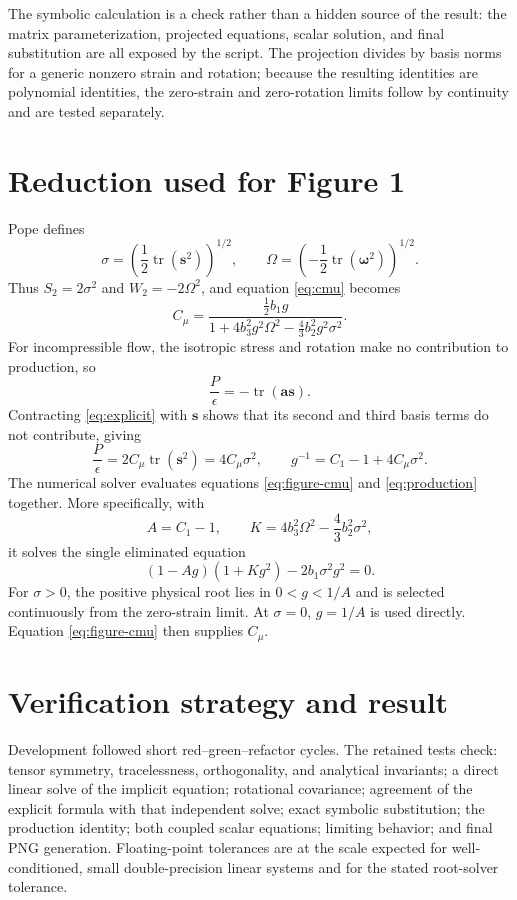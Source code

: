 \documentclass[11pt]{article}
\newcommand{\tr}[1]{\operatorname{tr}\!\left(#1\right)}
\newcommand{\bS}{\bm{s}}
\newcommand{\bW}{\bm{\omega}}
\newcommand{\bA}{\bm{a}}
\begin{document}
The symbolic calculation is a check rather than a hidden source of the result:
the matrix parameterization, projected equations, scalar solution, and final
substitution are all exposed by the script.  The projection divides by basis
norms for a generic nonzero strain and rotation; because the resulting
identities are polynomial identities, the zero-strain and zero-rotation limits
follow by continuity and are tested separately.

\section{Reduction used for Figure 1}
Pope defines
\begin{equation}
 \sigma=\left(\frac12\tr{\bS^2}\right)^{1/2},\qquad
 \Omega=\left(-\frac12\tr{\bW^2}\right)^{1/2}.
\end{equation}
Thus $S_2=2\sigma^2$ and $W_2=-2\Omega^2$, and equation
\eqref{eq:cmu} becomes
\begin{equation}
 C_\mu=\frac{\tfrac12b_1g}
 {1+4b_3^2g^2\Omega^2-\tfrac43b_2^2g^2\sigma^2}.
 \label{eq:figure-cmu}
\end{equation}
For incompressible flow, the isotropic stress and rotation make no contribution
to production, so
\begin{equation}
 \frac{P}{\epsilon}=-\tr{\bA\bS}.
\end{equation}
Contracting \eqref{eq:explicit} with $\bS$ shows that its second and third
basis terms do not contribute, giving
\begin{equation}
 \frac{P}{\epsilon}=2C_\mu\tr{\bS^2}=4C_\mu\sigma^2,
 \qquad
 g^{-1}=C_1-1+4C_\mu\sigma^2.
 \label{eq:production}
\end{equation}
The numerical solver evaluates equations \eqref{eq:figure-cmu} and
\eqref{eq:production} together.  More specifically, with
\begin{equation}
 A=C_1-1,\qquad
 K=4b_3^2\Omega^2-\frac43b_2^2\sigma^2,
\end{equation}
it solves the single eliminated equation
\begin{equation}
 (1-Ag)(1+Kg^2)-2b_1\sigma^2g^2=0.
 \label{eq:root}
\end{equation}
For $\sigma>0$, the positive physical root lies in $0<g<1/A$ and is selected
continuously from the zero-strain limit.  At $\sigma=0$, $g=1/A$ is used
directly.  Equation \eqref{eq:figure-cmu} then supplies $C_\mu$.

\section{Verification strategy and result}
Development followed short red--green--refactor cycles.  The retained tests
check: tensor symmetry, tracelessness, orthogonality, and analytical invariants;
a direct linear solve of the implicit equation; rotational covariance; agreement
of the explicit formula with that independent solve; exact symbolic
substitution; the production identity; both coupled scalar equations; limiting
behavior; and final PNG generation.  Floating-point tolerances are at the scale
expected for well-conditioned, small double-precision linear systems and for
the stated root-solver tolerance.
\end{document}
